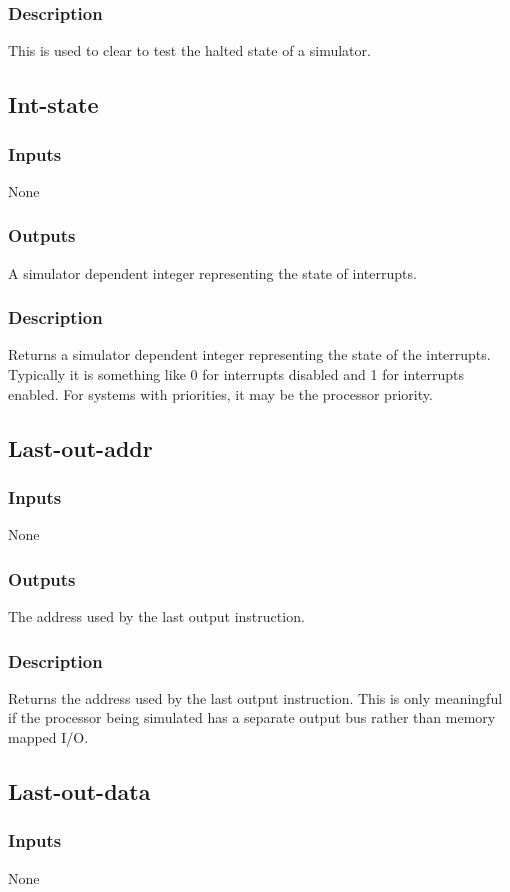 \documentclass[10pt, openany]{book}
\begin{document}
\subsubsection{Description}
This is used to clear to test the halted state of a simulator.

\subsection{Int-state}
\subsubsection{Inputs}
None
\subsubsection{Outputs}
A simulator dependent integer representing the state of interrupts.
\subsubsection{Description}
Returns a simulator dependent integer representing the state of the interrupts.  Typically it is something like 0 for interrupts disabled and 1 for interrupts enabled.  For systems with priorities, it may be the processor priority.

\subsection{Last-out-addr}
\subsubsection{Inputs}
None
\subsubsection{Outputs}
The address used by the last output instruction.
\subsubsection{Description}
Returns the address used by the last output instruction.  This is only meaningful if the processor being simulated has a separate output bus rather than memory mapped I/O.

\subsection{Last-out-data}
\subsubsection{Inputs}
None
\end{document}
